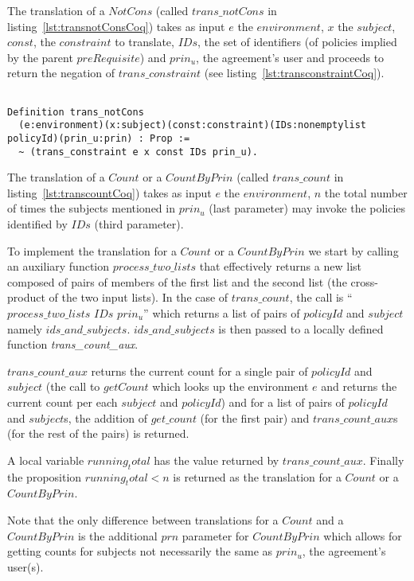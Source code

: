 The translation of a $NotCons$ (called $trans\_notCons$ in listing~\ref{lst:transnotConsCoq}) takes as input $e$ the $environment$, $x$ the $subject$, $const$, the $constraint$ to translate, $IDs$, the set of identifiers (of policies implied by the parent $preRequisite$) and $prin_{u}$, the agreement's user and proceeds to return the negation of $trans\_constraint$ (see listing~\ref{lst:transconstraintCoq}).

\begin{lstlisting}

Definition trans_notCons
  (e:environment)(x:subject)(const:constraint)(IDs:nonemptylist policyId)(prin_u:prin) : Prop :=
  ~ (trans_constraint e x const IDs prin_u).
\end{lstlisting}


The translation of a $Count$ or a $CountByPrin$ (called $trans\_count$ in listing~\ref{lst:transcountCoq}) takes as input $e$ the $environment$, $n$ the total number of times the subjects mentioned in $prin_{u}$ (last parameter) may invoke the policies identified by $IDs$ (third parameter).

To implement the translation for a $Count$ or a $CountByPrin$ we start by calling an auxiliary function $process\_two\_lists$ that effectively returns a new list composed of pairs of members of the first list and the second list (the cross-product of the two input lists). In the case of $trans\_count$, the call is ``$process\_two\_lists$ $IDs$ $prin_u$'' which returns a list of pairs of $policyId$ and $subject$ namely $ids\_and\_subjects$. $ids\_and\_subjects$ is then passed to a locally defined function \emph{trans_count_aux}.

$trans\_count\_aux$ returns the current count for a single pair of $policyId$ and $subject$ (the call to $getCount$ which looks up the environment $e$ and returns the current count per each $subject$ and $policyId$) and for a list of pairs of $policyId$ and $subject$s, the addition of $get\_count$ (for the first pair) and $trans\_count\_aux$s (for the rest of the pairs) is returned. 

A local variable $running_total$ has the value returned by $trans\_count\_aux$. Finally the proposition $running_total < n$ is returned as the translation for a $Count$ or a $CountByPrin$.

Note that the only difference between translations for a $Count$ and a $CountByPrin$ is the additional $prn$ parameter for $CountByPrin$ which allows for getting counts for subjects not necessarily the same as $prin_{u}$, the agreement's user(s).


